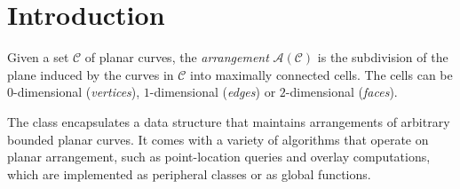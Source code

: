 \section*{Introduction}
\label{arr_ref_sec:intro}
Given a set $\mathcal{C}$ of planar curves, the {\em arrangement}
${\mathcal A}({\mathcal C})$ is the subdivision of the plane induced
by the curves in $\mathcal{C}$ into maximally connected cells. The cells
can be $0$-dimensional ({\em vertices}), $1$-dimensional ({\em edges})
or $2$-dimensional ({\em faces}).

The class  encapsulates a data structure
that maintains arrangements of arbitrary bounded planar curves. It comes
with a variety of algorithms that operate on planar arrangement,
such as point-location queries and overlay computations, which are
implemented as peripheral classes or as global functions.

